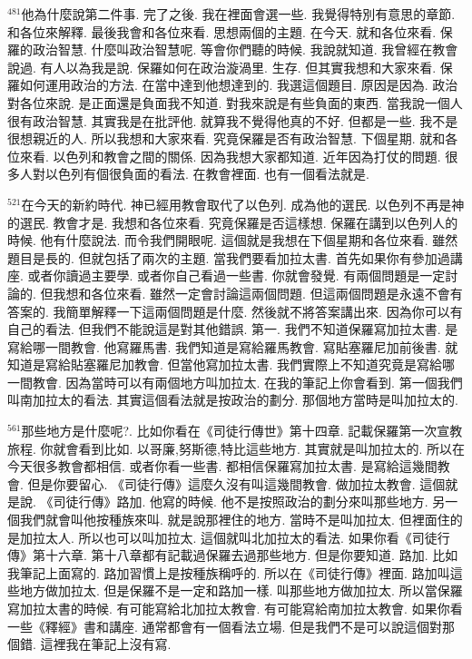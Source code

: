 \documentclass{book}
\begin{document}
$^{481}$他為什麼說第二件事.
完了之後.
我在裡面會選一些.
我覺得特別有意思的章節.
和各位來解釋.
最後我會和各位來看.
思想兩個的主題.
在今天.
就和各位來看.
保羅的政治智慧.
什麼叫政治智慧呢.
等會你們聽的時候.
我說就知道.
我曾經在教會說過.
有人以為我是說.
保羅如何在政治漩渦里.
生存.
但其實我想和大家來看.
保羅如何運用政治的方法.
在當中達到他想達到的.
我選這個題目.
原因是因為.
政治對各位來說.
是正面還是負面我不知道.
對我來說是有些負面的東西.
當我說一個人很有政治智慧.
其實我是在批評他.
就算我不覺得他真的不好.
但都是一些.
我不是很想親近的人.
所以我想和大家來看.
究竟保羅是否有政治智慧.
下個星期.
就和各位來看.
以色列和教會之間的關係.
因為我想大家都知道.
近年因為打仗的問題.
很多人對以色列有個很負面的看法.
在教會裡面.
也有一個看法就是.

$^{521}$在今天的新約時代.
神已經用教會取代了以色列.
成為他的選民.
以色列不再是神的選民.
教會才是.
我想和各位來看.
究竟保羅是否這樣想.
保羅在講到以色列人的時候.
他有什麼說法.
而令我們開眼呢.
這個就是我想在下個星期和各位來看.
雖然題目是長的.
但就包括了兩次的主題.
當我們要看加拉太書.
首先如果你有參加過講座.
或者你讀過主要學.
或者你自己看過一些書.
你就會發覺.
有兩個問題是一定討論的.
但我想和各位來看.
雖然一定會討論這兩個問題.
但這兩個問題是永遠不會有答案的.
我簡單解釋一下這兩個問題是什麼.
然後就不將答案講出來.
因為你可以有自己的看法.
但我們不能說這是對其他錯誤.
第一.
我們不知道保羅寫加拉太書.
是寫給哪一間教會.
他寫羅馬書.
我們知道是寫給羅馬教會.
寫貼塞羅尼加前後書.
就知道是寫給貼塞羅尼加教會.
但當他寫加拉太書.
我們實際上不知道究竟是寫給哪一間教會.
因為當時可以有兩個地方叫加拉太.
在我的筆記上你會看到.
第一個我們叫南加拉太的看法.
其實這個看法就是按政治的劃分.
那個地方當時是叫加拉太的.

$^{561}$那些地方是什麼呢?.
比如你看在《司徒行傳世》第十四章.
記載保羅第一次宣教旅程.
你就會看到比如.
以哥廉,努斯德,特比這些地方.
其實就是叫加拉太的.
所以在今天很多教會都相信.
或者你看一些書.
都相信保羅寫加拉太書.
是寫給這幾間教會.
但是你要留心.
《司徒行傳》這麼久沒有叫這幾間教會.
做加拉太教會.
這個就是說.
《司徒行傳》路加.
他寫的時候.
他不是按照政治的劃分來叫那些地方.
另一個我們就會叫他按種族來叫.
就是說那裡住的地方.
當時不是叫加拉太.
但裡面住的是加拉太人.
所以也可以叫加拉太.
這個就叫北加拉太的看法.
如果你看《司徒行傳》第十六章.
第十八章都有記載過保羅去過那些地方.
但是你要知道.
路加.
比如我筆記上面寫的.
路加習慣上是按種族稱呼的.
所以在《司徒行傳》裡面.
路加叫這些地方做加拉太.
但是保羅不是一定和路加一樣.
叫那些地方做加拉太.
所以當保羅寫加拉太書的時候.
有可能寫給北加拉太教會.
有可能寫給南加拉太教會.
如果你看一些《釋經》書和講座.
通常都會有一個看法立場.
但是我們不是可以說這個對那個錯.
這裡我在筆記上沒有寫.
\end{document}
